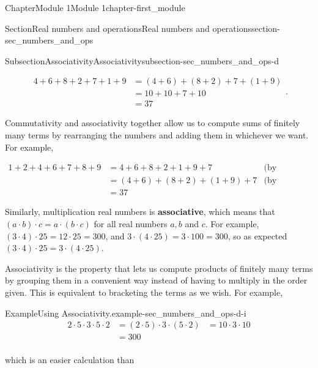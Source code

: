 \documentclass[oneside,10pt,]{book}
\newcommand{\terminology}[1]{\textbf{#1}}
\begin{document}
\begin{chapterptx}{Chapter}{Module 1}{}{Module 1}{}{}{chapter-first_module}
\begin{sectionptx}{Section}{Real numbers and operations}{}{Real numbers and operations}{}{}{section-sec_numbers_and_ops}
\begin{subsectionptx}{Subsection}{Associativity}{}{Associativity}{}{}{subsection-sec_numbers_and_ops-d}
\par
%
\begin{equation*}
\begin{aligned}
4 + 6 + 8 + 2 + 7 + 1 + 9 &= (4 + 6) + (8 + 2)  + 7 + (1 + 9) \\
&= 10 + 10  + 7 + 10 \\
&= 37
\end{aligned}\text{.}
\end{equation*}
%
\par
Commutativity and associativity together allow us to compute sums of finitely many terms by rearranging the numbers and adding them in whichever we want.  For example,%
\par
%
\begin{equation*}
\begin{aligned}
1 + 2 + 4 + 6 + 7 + 8 + 9 &=  4 + 6 + 8 + 2 + 1 + 9 + 7 &\text{(by commutativity)} \\
&= (4 + 6) + (8 + 2) + (1 + 9)  + 7   &\text{(by associativity)} \\
&= 37
\end{aligned}
\end{equation*}
%
\par
Similarly, multiplication real numbers is \terminology{associative}, which means that \((a \cdot b) \cdot c = a \cdot (b \cdot c)\) for all real numbers \(a, b\) and \(c\).  For example, \((3\cdot4)\cdot25 = 12\cdot 25 = 300\), and \(3\cdot(4\cdot25)=3\cdot100=300\), so as expected \((3\cdot4)\cdot25 = 3\cdot(4\cdot25)\).%
\par
Associativity is the property that lets us compute products of finitely many terms by grouping them in a convenient way instead of having to multiply in the order given.  This is equivalent to bracketing the terms as we wish.  For example,%
\begin{example}{Example}{Using Associativity.}{example-sec_numbers_and_ops-d-i}%
%
\begin{equation*}
\begin{aligned}
2 \cdot 5 \cdot 3 \cdot 5 \cdot 2 &= (2 \cdot 5) \cdot 3 \cdot (5 \cdot 2)
&= 10 \cdot 3 \cdot 10 \\
&= 300 \\
\end{aligned}
\end{equation*}
%
\par
which is an easier calculation than%
\par
%
\begin{equation*}
\begin{aligned}

\end{aligned}
\end{equation*}
\end{example}
\end{subsectionptx}
\end{sectionptx}
\end{chapterptx}
\end{document}
